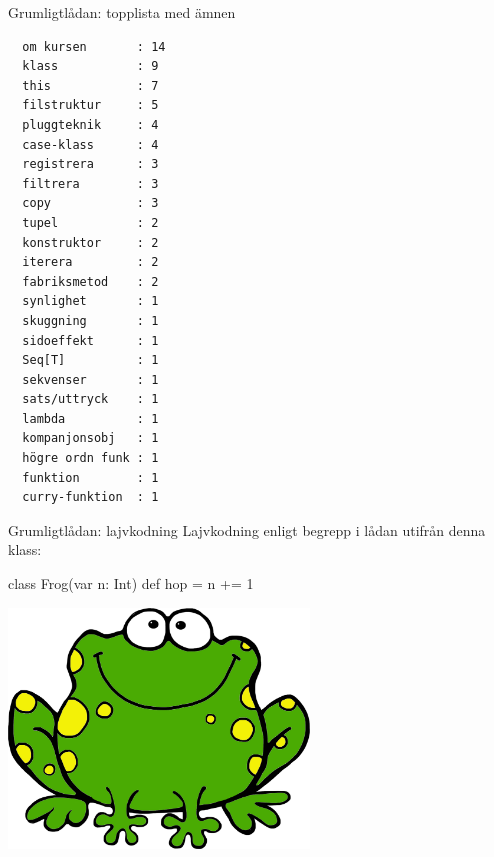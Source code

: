 
\ifkompendium\else
{}

\begin{Slide}{Grumligtlådan: topplista med ämnen}
\begin{multicols}{2}
\begin{verbatim}
  om kursen       : 14
  klass           : 9
  this            : 7
  filstruktur     : 5
  pluggteknik     : 4
  case-klass      : 4
  registrera      : 3
  filtrera        : 3
  copy            : 3
  tupel           : 2
  konstruktor     : 2
  iterera         : 2
  fabriksmetod    : 2
  synlighet       : 1
  skuggning       : 1
  sidoeffekt      : 1
  Seq[T]          : 1
  sekvenser       : 1
  sats/uttryck    : 1
  lambda          : 1
  kompanjonsobj   : 1
  högre ordn funk : 1
  funktion        : 1
  curry-funktion  : 1
\end{verbatim}
\end{multicols}
\end{Slide}



\begin{Slide}{Grumligtlådan: lajvkodning}
Lajvkodning enligt begrepp i lådan utifrån denna klass:
\begin{Code}[basicstyle=\ttfamily\SlideFontSize{12}{14}]
class Frog(var n: Int) { def hop = n += 1 }
\end{Code}
\includegraphics[width=0.6\textwidth]{../img/frog}
\end{Slide}

\fi
